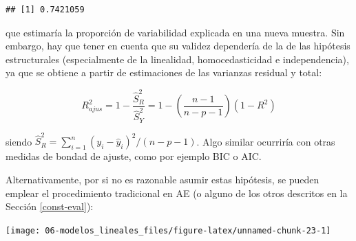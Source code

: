 \documentclass[
  spanish,
]{book}
\newenvironment{Shaded}{\begin{snugshade}}{\end{snugshade}}
\newcommand{\DataTypeTok}[1]{\textcolor[rgb]{0.13,0.29,0.53}{#1}}
\newcommand{\KeywordTok}[1]{\textcolor[rgb]{0.13,0.29,0.53}{\textbf{#1}}}
\newcommand{\NormalTok}[1]{#1}
\newcommand{\OperatorTok}[1]{\textcolor[rgb]{0.81,0.36,0.00}{\textbf{#1}}}
\newcommand{\StringTok}[1]{\textcolor[rgb]{0.31,0.60,0.02}{#1}}
\theoremstyle{break}
\theoremstyle{definition}
\theoremstyle{definition}
\theoremstyle{definition}
\theoremstyle{remark}
\begin{document}
\begin{verbatim}
## [1] 0.7421059
\end{verbatim}

que estimaría la proporción de variabilidad explicada en una nueva muestra.
Sin embargo, hay que tener en cuenta que su validez dependería de la de las hipótesis estructurales (especialmente de la linealidad, homocedasticidad e independencia), ya que se obtiene a partir de estimaciones de las varianzas residual y total:

\[R_{ajus}^{2} = 1 - \frac{\hat{S}_{R}^{2}}{\hat{S}_{Y}^{2}} 
= 1 - \left( \frac{n-1}{n-p-1} \right) (1-R^{2})\]

siendo \(\hat{S}_{R}^{2}=\sum_{i=1}^{n}(y_{i}-\hat{y}_{i})^{2}/(n - p - 1)\).
Algo similar ocurriría con otras medidas de bondad de ajuste, como por ejemplo BIC o AIC.

Alternativamente, por si no es razonable asumir estas hipótesis, se pueden emplear el procedimiento tradicional en AE (o alguno de los otros descritos en la Sección \ref{const-eval}):

\begin{Shaded}
\end{Shaded}

\begin{center}\texttt{[image: 06-modelos\_lineales\_files/figure-latex/unnamed-chunk-23-1]} \end{center}
\end{document}
